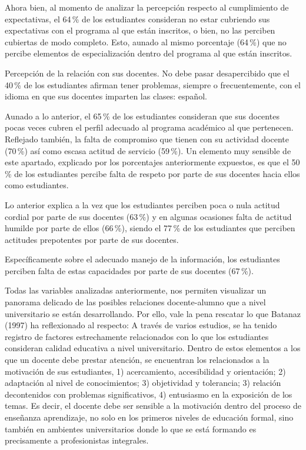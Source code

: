  
Ahora bien, al momento de analizar la percepción respecto al cumplimiento de
expectativas, el 64\,\% de los estudiantes consideran no estar cubriendo sus
expectativas con el programa al que están inscritos, o bien, no las
perciben cubiertas de modo completo. Esto, aunado al mismo porcentaje
(64\,\%) que no percibe elementos de especialización dentro del programa al
que están inscritos.

 
Percepción de la relación con sus docentes. No debe pasar desapercibido que
el 40\,\% de los estudiantes afirman tener problemas, siempre o
frecuentemente, con el idioma en que sus docentes imparten las clases:
español.

 
Aunado a lo anterior, el 65\,\% de los estudiantes consideran que sus docentes
pocas veces cubren el perfil adecuado al programa académico al que
pertenecen. Reflejado también, la falta de compromiso que tienen con su
actividad docente (70\,\%) así como escasa actitud de servicio (59\,\%). Un
elemento muy sensible de este apartado, explicado por los porcentajes
anteriormente expuestos, es que el 50\,\% de los estudiantes percibe falta de
respeto por parte de sus docentes hacia ellos como estudiantes.
 
Lo anterior explica a la vez que los estudiantes perciben poca o nula
actitud cordial por parte de sus docentes (63\,\%) y en algunas ocasiones
falta de actitud humilde por parte de ellos (66\,\%), siendo el 77\,\% de los
estudiantes que perciben actitudes prepotentes por parte de sus docentes.

\enlargethispage{1\baselineskip} 
Específicamente sobre el adecuado manejo de la información, los estudiantes
perciben falta de estas capacidades por parte de sus docentes (67\,\%).
 
Todas las variables analizadas anteriormente, nos permiten visualizar un
panorama delicado de las posibles relaciones docente-alumno que a nivel
universitario se están desarrollando. Por ello, vale la pena rescatar lo
que Batanaz (1997) ha reflexionado al respecto: A través de varios
estudios, se ha tenido registro de factores estrechamente relacionados con
lo que los estudiantes consideran calidad educativa a nivel universitario.
Dentro de estos elementos a los que un docente debe prestar atención, se
encuentran los relacionados a la motivación de sus estudiantes, 1)
acercamiento, accesibilidad y orientación; 2) adaptación al nivel de
conocimientos; 3) objetividad y tolerancia; 3) relación de\linebreak contenidos con
problemas significativos, 4) entusiasmo en la exposición de los temas. Es
decir, el docente debe ser sensible a la motivación dentro del proceso de
enseñanza aprendizaje, no solo en los primeros niveles de educación formal,
sino también en ambientes universitarios donde lo que se está formando es
precisamente a profesionistas integrales.

